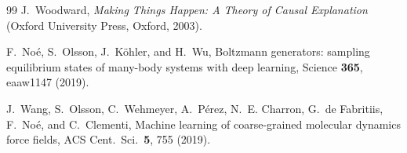 \documentclass[aps,pre,preprint,superscriptaddress,showpacs]{revtex4-2}
\begin{document}
\begin{thebibliography}{99}
J.~Woodward,
\textit{Making Things Happen: A Theory of Causal Explanation}
(Oxford University Press, Oxford, 2003).

F.~No\'{e}, S.~Olsson, J.~K\"{o}hler, and H.~Wu,
Boltzmann generators: sampling equilibrium states of many-body systems
with deep learning,
Science \textbf{365}, eaaw1147 (2019).

J.~Wang, S.~Olsson, C.~Wehmeyer, A.~P\'{e}rez, N.~E. Charron,
G.~de Fabritiis, F.~No\'{e}, and C.~Clementi,
Machine learning of coarse-grained molecular dynamics force fields,
ACS Cent.\ Sci.\ \textbf{5}, 755 (2019).

\end{thebibliography}
\end{document}
